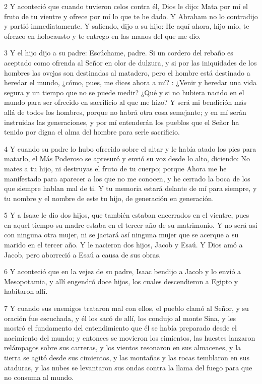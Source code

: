 \par 2 Y aconteció que cuando tuvieron celos contra él, Dios le dijo: Mata por mí el fruto de tu vientre y ofrece por mí lo que te he dado. Y Abraham no lo contradijo y partió inmediatamente. Y saliendo, dijo a su hijo: He aquí ahora, hijo mío, te ofrezco en holocausto y te entrego en las manos del que me dio.

\par 3 Y el hijo dijo a su padre: Escúchame, padre. Si un cordero del rebaño es aceptado como ofrenda al Señor en olor de dulzura, y si por las iniquidades de los hombres las ovejas son destinadas al matadero, pero el hombre está destinado a heredar el mundo, ¿cómo, pues, me dices ahora a mí? : ¿Venir y heredar una vida segura y un tiempo que no se puede medir? ¿Qué y si no hubiera nacido en el mundo para ser ofrecido en sacrificio al que me hizo? Y será mi bendición más allá de todos los hombres, porque no habrá otra cosa semejante; y en mí serán instruidas las generaciones, y por mí entenderán los pueblos que el Señor ha tenido por digna el alma del hombre para serle sacrificio.

\par 4 Y cuando su padre lo hubo ofrecido sobre el altar y le había atado los pies para matarlo, el Más Poderoso se apresuró y envió su voz desde lo alto, diciendo: No mates a tu hijo, ni destruyas el fruto de tu cuerpo; porque Ahora me he manifestado para aparecer a los que no me conocen, y he cerrado la boca de los que siempre hablan mal de ti. Y tu memoria estará delante de mí para siempre, y tu nombre y el nombre de este tu hijo, de generación en generación.

\par 5 Y a Isaac le dio dos hijos, que también estaban encerrados en el vientre, pues en aquel tiempo su madre estaba en el tercer año de su matrimonio. Y no será así con ninguna otra mujer, ni se jactará así ninguna mujer que se acerque a su marido en el tercer año. Y le nacieron dos hijos, Jacob y Esaú. Y Dios amó a Jacob, pero aborreció a Esaú a causa de sus obras.

\par 6 Y aconteció que en la vejez de su padre, Isaac bendijo a Jacob y lo envió a Mesopotamia, y allí engendró doce hijos, los cuales descendieron a Egipto y habitaron allí.

\par 7 Y cuando sus enemigos trataron mal con ellos, el pueblo clamó al Señor, y su oración fue escuchada, y él los sacó de allí, los condujo al monte Sina, y les mostró el fundamento del entendimiento que él se había preparado desde el nacimiento del mundo; y entonces se movieron los cimientos, las huestes lanzaron relámpagos sobre sus carreras, y los vientos resonaron en sus almacenes, y la tierra se agitó desde sus cimientos, y las montañas y las rocas temblaron en sus ataduras, y las nubes se levantaron sus ondas contra la llama del fuego para que no consuma al mundo.

